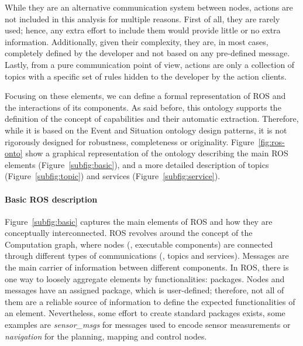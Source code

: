 While they are an alternative communication system between nodes, actions are not included in this analysis for multiple reasons. First of all, they are rarely used; hence, any extra effort to include them would provide little or no extra information. Additionally, given their complexity, they are, in most cases, completely defined by the developer and not based on any pre-defined message. Lastly, from a pure communication point of view, actions are only a collection of topics with a specific set of rules hidden to the developer by the action clients. 

Focusing on these elements, we can define a formal representation of ROS and the interactions of its components. As said before, this ontology supports the definition of the concept of capabilities and their automatic extraction. Therefore, while it is based on the Event and Situation ontology design patterns, it is not rigorously designed for robustness, completeness or originality. Figure~\ref{fig:ros-onto} show a graphical representation of the ontology describing the main ROS elements (Figure~\ref{subfig:basic}), and a more detailed description of topics (Figure~\ref{subfig:topic}) and services (Figure~\ref{subfig:service}).

\paragraph{Basic ROS description} Figure~\ref{subfig:basic} captures the main elements of ROS and how they are conceptually interconnected. ROS revolves around the concept of the Computation graph, where nodes (\ie, executable components) are connected through different types of communications (\ie, topics and services). Messages are the main carrier of information between different components. In ROS, there is one way to loosely aggregate elements by functionalities: packages. Nodes and messages have an assigned package, which is user-defined; therefore, not all of them are a reliable source of information to define the expected functionalities of an element. Nevertheless, some effort to create standard packages exists, some examples are \textit{sensor\_msgs} for messages used to encode sensor measurements or \textit{navigation} for the planning, mapping and control nodes.

